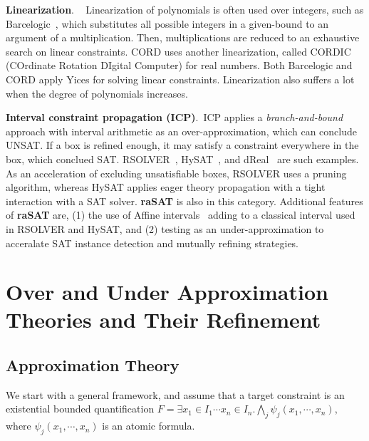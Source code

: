 \documentclass[runningheads,a4paper,oribibl]{llncs}
\newcommand{\mizuhito}[1]{\{{\bf Mizuhito:~\sf #1}\}} %
\begin{document}
\medskip \noindent
\textbf{Linearization}. ~
Linearization of polynomials is often used over integers, such as Barcelogic~\cite{barce}, 
which substitutes all possible integers in a given-bound to an argument of a multiplication. 
Then, multiplications are reduced to an exhaustive search on linear constraints. 
CORD \cite{cord} uses another linearization, called 
CORDIC (COrdinate Rotation DIgital Computer) for real numbers. 
Both Barcelogic and CORD apply Yices for solving linear constraints.
Linearization also suffers a lot when the degree of polynomials increases. 


\medskip \noindent
\textbf{Interval constraint propagation (ICP)}.~ICP applies a {\em branch-and-bound}
approach with interval arithmetic as an over-approximation, which can conclude UNSAT. 
If a box is refined enough, 
it may satisfy a constraint everywhere in the box, which conclued SAT. 
RSOLVER~\cite{rsolver}, HySAT~\cite{isat}, and dReal~\cite{dRealCADE13} are such examples. 
As an acceleration of excluding unsatisfiable boxes, RSOLVER uses a pruning algorithm, whereas 
HySAT applies eager theory propagation with a tight interaction with a SAT solver. 
{\bf raSAT} is also in this category. 
Additional features of {\bf raSAT} are, (1) the use of  Affine intervals~\cite{Stolfi03}
adding to a classical interval used in RSOLVER and HySAT, and 
(2) testing as an under-approximation to acceralate SAT instance detection and 
mutually refining strategies. 





\section{Over and Under Approximation Theories and Their Refinement}
\label{sec:raSATloop} 
\subsection{Approximation Theory}

We start with a general framework, and assume that a target constraint is 
an existential bounded quantification 
$F = \exists x_1 \in I_1 \cdots x_n \in I_n. \bigwedge \limits_j \psi_j(x_1,\cdots,x_n)$, 
where $\psi_j(x_1,\cdots,x_n)$ is an atomic formula. 
\end{document}
